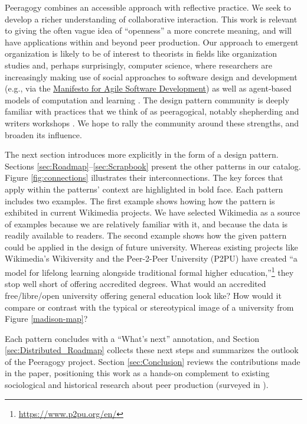 Peeragogy combines an accessible approach with reflective practice.   We seek to develop a richer understanding of collaborative interaction.  This work is relevant to giving the often vague idea of ``openness'' a more concrete meaning, and will have applications within and beyond peer production.  Our approach to emergent organization is likely to be of interest to theorists in fields like organization studies and, perhaps surprisingly, computer science, where researchers are increasingly making use of social approaches to software design and development (e.g., via the \href{http://www.agilemanifesto.org/}{Manifesto for Agile Software Development}) as well as agent-based models of computation and learning \cite{minsky1967programming,poetry-workshop}.  The design pattern community is deeply familiar with practices that we think of as peeragogical, notably shepherding and writers workshops \cite{gabriel2002writer}.  We hope to rally the community around these strengths, and broaden its influence.

The next section introduces  more explicitly in the form of a design pattern.  Sections \ref{sec:Roadmap}--\ref{sec:Scrapbook} present the other patterns in our catalog.  Figure \ref{fig:connections} illustrates their interconnections.  The key forces that apply within the patterns' context are highlighted in bold face.  Each pattern includes two examples. The first example shows howing how the pattern is exhibited in current Wikimedia projects.  We have selected Wikimedia as a source of examples because we are relatively familiar with it, and because the data is readily available to readers.  The second example shows how the given pattern could be applied in the design of future university.  Whereas existing projects like Wikimedia's Wikiversity and the Peer-2-Peer University (P2PU) have created ``a model for lifelong learning alongside traditional formal higher education,''\footnote{\url{https://www.p2pu.org/en/}} they stop well short of offering accredited degrees.  What would an accredited free/libre/open university offering general education look like?  How would it compare or contrast with the typical or stereotypical image of a university from Figure \ref{madison-map}?

Each pattern concludes with a ``What's next'' annotation, and Section \ref{sec:Distributed_Roadmap} collects these next steps and summarizes the outlook of the Peeragogy project.  Section \ref{sec:Conclusion} reviews the contributions made in the paper, positioning this work as a hands-on complement to existing sociological and historical research about peer production (surveyed in \cite{benkler2015peer}).

